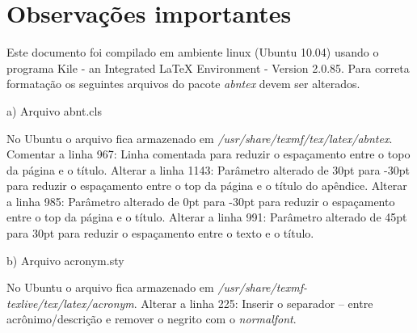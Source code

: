 \chapter{Observações importantes}
\label{cap3}

\vspace{-1.9cm}


  Este documento foi compilado em ambiente linux (Ubuntu 10.04) usando o programa Kile - an Integrated LaTeX Environment - Version 2.0.85.
  Para correta formatação os seguintes arquivos do pacote \textit{abntex} devem ser alterados.

    \begin{compactitem}
      \item[a)] Arquivo abnt.cls

      No Ubuntu o arquivo fica armazenado em \textit{/usr/share/texmf/tex/latex/abntex}.
      Comentar a linha 967: Linha comentada para reduzir o espaçamento entre o topo da página e o título.
      Alterar a linha 1143: Parâmetro alterado de 30pt para -30pt para reduzir o espaçamento entre o top da página e o título do apêndice.
      Alterar a linha 985: Parâmetro alterado de 0pt para -30pt para reduzir o espaçamento entre o top da página e o título.
      Alterar a linha 991: Parâmetro alterado de 45pt para 30pt para reduzir o espaçamento entre o texto e o título.

      \item[b)] Arquivo acronym.sty

      No Ubuntu o arquivo fica armazenado em \textit{/usr/share/texmf-texlive/tex/latex/acronym}.
      Alterar a linha 225: Inserir o separador -- entre acrônimo/descrição e remover o negrito com o \textit{normalfont}.

    \end{compactitem}